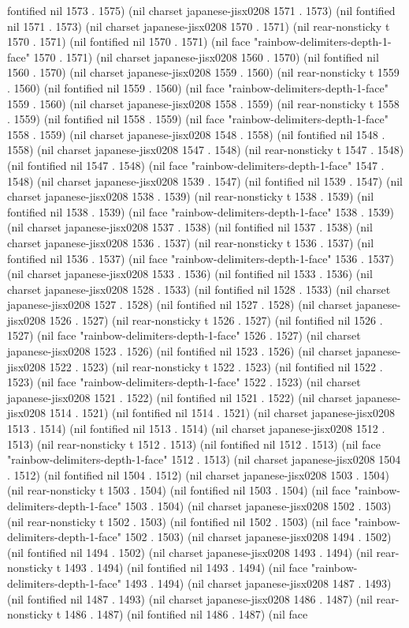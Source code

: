 fontified nil 1573 . 1575) (nil charset japanese-jisx0208 1571 . 1573) (nil fontified nil 1571 . 1573) (nil charset japanese-jisx0208 1570 . 1571) (nil rear-nonsticky t 1570 . 1571) (nil fontified nil 1570 . 1571) (nil face "rainbow-delimiters-depth-1-face" 1570 . 1571) (nil charset japanese-jisx0208 1560 . 1570) (nil fontified nil 1560 . 1570) (nil charset japanese-jisx0208 1559 . 1560) (nil rear-nonsticky t 1559 . 1560) (nil fontified nil 1559 . 1560) (nil face "rainbow-delimiters-depth-1-face" 1559 . 1560) (nil charset japanese-jisx0208 1558 . 1559) (nil rear-nonsticky t 1558 . 1559) (nil fontified nil 1558 . 1559) (nil face "rainbow-delimiters-depth-1-face" 1558 . 1559) (nil charset japanese-jisx0208 1548 . 1558) (nil fontified nil 1548 . 1558) (nil charset japanese-jisx0208 1547 . 1548) (nil rear-nonsticky t 1547 . 1548) (nil fontified nil 1547 . 1548) (nil face "rainbow-delimiters-depth-1-face" 1547 . 1548) (nil charset japanese-jisx0208 1539 . 1547) (nil fontified nil 1539 . 1547) (nil charset japanese-jisx0208 1538 . 1539) (nil rear-nonsticky t 1538 . 1539) (nil fontified nil 1538 . 1539) (nil face "rainbow-delimiters-depth-1-face" 1538 . 1539) (nil charset japanese-jisx0208 1537 . 1538) (nil fontified nil 1537 . 1538) (nil charset japanese-jisx0208 1536 . 1537) (nil rear-nonsticky t 1536 . 1537) (nil fontified nil 1536 . 1537) (nil face "rainbow-delimiters-depth-1-face" 1536 . 1537) (nil charset japanese-jisx0208 1533 . 1536) (nil fontified nil 1533 . 1536) (nil charset japanese-jisx0208 1528 . 1533) (nil fontified nil 1528 . 1533) (nil charset japanese-jisx0208 1527 . 1528) (nil fontified nil 1527 . 1528) (nil charset japanese-jisx0208 1526 . 1527) (nil rear-nonsticky t 1526 . 1527) (nil fontified nil 1526 . 1527) (nil face "rainbow-delimiters-depth-1-face" 1526 . 1527) (nil charset japanese-jisx0208 1523 . 1526) (nil fontified nil 1523 . 1526) (nil charset japanese-jisx0208 1522 . 1523) (nil rear-nonsticky t 1522 . 1523) (nil fontified nil 1522 . 1523) (nil face "rainbow-delimiters-depth-1-face" 1522 . 1523) (nil charset japanese-jisx0208 1521 . 1522) (nil fontified nil 1521 . 1522) (nil charset japanese-jisx0208 1514 . 1521) (nil fontified nil 1514 . 1521) (nil charset japanese-jisx0208 1513 . 1514) (nil fontified nil 1513 . 1514) (nil charset japanese-jisx0208 1512 . 1513) (nil rear-nonsticky t 1512 . 1513) (nil fontified nil 1512 . 1513) (nil face "rainbow-delimiters-depth-1-face" 1512 . 1513) (nil charset japanese-jisx0208 1504 . 1512) (nil fontified nil 1504 . 1512) (nil charset japanese-jisx0208 1503 . 1504) (nil rear-nonsticky t 1503 . 1504) (nil fontified nil 1503 . 1504) (nil face "rainbow-delimiters-depth-1-face" 1503 . 1504) (nil charset japanese-jisx0208 1502 . 1503) (nil rear-nonsticky t 1502 . 1503) (nil fontified nil 1502 . 1503) (nil face "rainbow-delimiters-depth-1-face" 1502 . 1503) (nil charset japanese-jisx0208 1494 . 1502) (nil fontified nil 1494 . 1502) (nil charset japanese-jisx0208 1493 . 1494) (nil rear-nonsticky t 1493 . 1494) (nil fontified nil 1493 . 1494) (nil face "rainbow-delimiters-depth-1-face" 1493 . 1494) (nil charset japanese-jisx0208 1487 . 1493) (nil fontified nil 1487 . 1493) (nil charset japanese-jisx0208 1486 . 1487) (nil rear-nonsticky t 1486 . 1487) (nil fontified nil 1486 . 1487) (nil face 